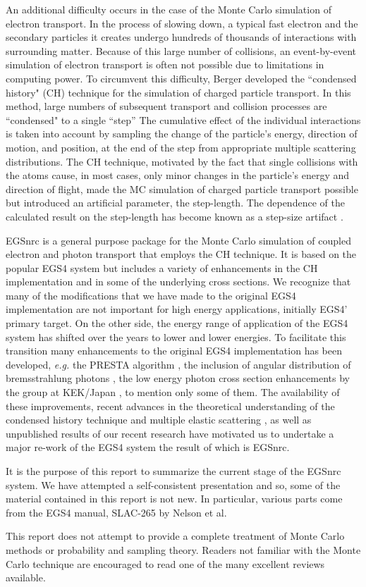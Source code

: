 An additional difficulty occurs in the case of the Monte Carlo 
simulation of electron transport. In the process of slowing down, 
a typical fast electron
and the secondary particles it creates
undergo hundreds of thousands of interactions with
surrounding matter.  Because of this large number of collisions,
an event-by-event simulation of electron transport is often
not possible due to limitations in computing power.  To
circumvent this difficulty, Berger \cite{Be63} developed the
``condensed history" (CH) technique for the simulation 
of charged particle transport. In this method, large numbers of
subsequent transport and collision 
processes are ``condensed" to a single ``step''
The cumulative effect of the individual interactions is taken
into account by sampling the change of the particle's energy, 
direction of motion, and position, at the end of the step from appropriate
multiple scattering distributions.
The CH technique, motivated
by the fact that single collisions with the atoms cause, in most cases,
only minor changes in the particle's energy and direction of flight,
made the MC simulation of charged particle transport possible but introduced
an artificial parameter, the step-length. The dependence of the calculated
result on the step-length has become known as a step-size artifact
\cite{BR89}.

EGSnrc is a general purpose package for the Monte Carlo 
simulation of coupled electron and photon transport that 
employs the CH technique. 
It is based on the popular EGS4 system \cite{Ne85} 
but includes a variety of enhancements in the CH implementation 
and in some of the underlying cross sections. We recognize that many 
of the modifications that we have made to the original 
EGS4 implementation are not important for 
high energy applications, initially EGS4' primary target.   
On the other side, the energy range of application of the 
EGS4 system has shifted over the years to lower and lower 
energies. To facilitate this transition many enhancements 
to the original EGS4 implementation has been developed, 
{\em e.g.} the PRESTA algorithm \cite{BR87}, the 
inclusion of angular distribution of bremsstrahlung 
photons \cite{Bi89}, the low energy photon cross section 
enhancements by the group at KEK/Japan \cite{Na98}, to 
mention only some of them. The availability of these 
improvements, recent advances in the theoretical understanding 
of the condensed history technique \cite{KB97a,Ka99a} and 
multiple elastic scattering \cite{KB97}, as well as 
unpublished results of our recent research have 
motivated us to undertake a major re-work of the EGS4 
system the result of which is EGSnrc. 

It is the purpose of this report to summarize the current stage of the 
EGSnrc system. We have attempted a self-consistent presentation 
and so, some of the material contained in this report is 
not new. In particular, various parts come from the EGS4 manual, SLAC-265
by Nelson et al\cite{Ne85}.

This report does not attempt to provide a complete treatment of Monte 
Carlo methods or probability and sampling theory. 
Readers not familiar with the Monte Carlo technique are encouraged to   
read one of the many excellent reviews available.  
